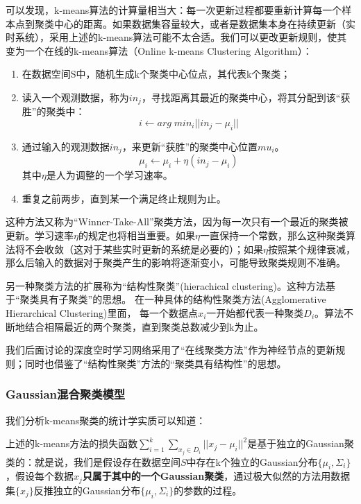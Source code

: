 可以发现，k-means算法的计算量相当大：每一次更新过程都要重新计算每一个样本点到聚类中心的距离。如果数据集容量较大，或者是数据集本身在持续更新（实时系统），采用上述的k-means算法可能不太合适。我们可以更改更新规则，使其变为一个在线的k-means算法（Online k-means Clustering Algorithm）：

\begin{enumerate}
\item 在数据空间S中，随机生成k个聚类中心位点，其代表k个聚类；
\item 读入一个观测数据，称为$in_j$，寻找距离其最近的聚类中心，将其分配到该“获胜”的聚类中：
\begin{equation}
i \leftarrow arg\;min_i ||in_j - \mu_i||
\end{equation}
\item 通过输入的观测数据$in_j$，来更新“获胜”的聚类中心位置$mu_i$。
\begin{equation}
\mu_i \leftarrow \mu_i + \eta(in_j - \mu_i)
\end{equation}
其中$\eta$是人为调整的一个学习速率。
\item 重复之前两步，直到某一个满足终止规则为止。
\end{enumerate}

这种方法又称为“Winner-Take-All”聚类方法，因为每一次只有一个最近的聚类被更新。学习速率$\eta$的规定也将相当重要。如果$\eta$一直保持一个常数，那么这种聚类算法将不会收敛（这对于某些实时更新的系统是必要的）；如果$\eta$按照某个规律衰减，那么后输入的数据对于聚类产生的影响将逐渐变小，可能导致聚类规则不准确。

另一种聚类方法的扩展称为“结构性聚类”(hierachical clustering)。这种方法基于“聚类具有子聚类”的思想。 在一种具体的结构性聚类方法(Agglomerative Hierarchical Clustering)里面，\cite{Duda2001Pattern}
每一个数据点$x_i$一开始都代表一种聚类$D_i$。算法不断地结合相隔最近的两个聚类，直到聚类总数减少到k为止。

我们后面讨论的深度空时学习网络采用了“在线聚类方法”作为神经节点的更新规则；同时也借鉴了“结构性聚类”方法的“聚类具有结构性”的思想。

\subsubsection{Gaussian混合聚类模型}
我们分析k-means聚类的统计学实质可以知道：

上述的k-means方法的损失函数$\sum^k_{i=1} \sum_{x_j\in D_i} ||x_j - \mu_i||^2$是基于独立的Gaussian聚类的：就是说，我们是假设存在数据空间$S$中存在k个独立的Gaussian分布$\{\mu_i, \Sigma_i\}$，假设每个数据$x_j$\textbf{只属于其中的一个Gaussian聚类}，通过极大似然的方法用数据集$\{x_j\}$反推独立的Gaussian分布$\{\mu_i, \Sigma_i\}$的参数的过程。

